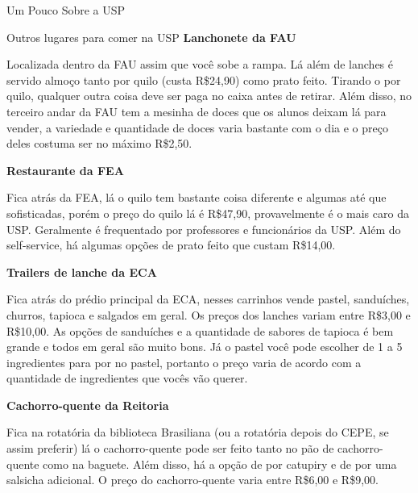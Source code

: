 \begin{secao}{Um Pouco Sobre a USP}
\begin{subsecao}{Outros lugares para comer na USP}
{\bf Lanchonete da FAU}

Localizada dentro da FAU assim que você sobe a rampa. Lá além de lanches é servido almoço
tanto por quilo (custa R\$24,90) como prato feito. Tirando o por quilo, qualquer outra coisa
deve ser paga no caixa antes de retirar. Além disso, no terceiro andar da FAU tem a mesinha
de doces que os alunos deixam lá para vender, a variedade e quantidade de doces varia bastante
com o dia e o preço deles costuma ser no máximo R\$2,50.

{\bf Restaurante da FEA}

Fica atrás da FEA, lá o quilo tem bastante coisa diferente e algumas até que sofisticadas,
porém o preço do quilo lá é R\$47,90, provavelmente é o mais caro da USP. Geralmente
é frequentado por professores e funcionários da USP. Além do self-service, há algumas opções
de prato feito que custam R\$14,00.

{\bf Trailers de lanche da ECA}

Fica atrás do prédio principal da ECA, nesses carrinhos vende pastel, sanduíches, churros,
tapioca e salgados em geral. Os preços dos lanches variam entre R\$3,00 e R\$10,00. As opções de
sanduíches e a quantidade de sabores de tapioca é bem grande e todos em geral são muito bons.
Já o pastel você pode escolher de 1 a 5 ingredientes para por no pastel, portanto o preço
varia de acordo com a quantidade de ingredientes que vocês vão querer.

{\bf Cachorro-quente da Reitoria}

Fica na rotatória da biblioteca Brasiliana (ou a rotatória depois do CEPE, se assim preferir)
lá o cachorro-quente pode ser feito tanto no pão de cachorro-quente como na baguete. Além disso,
há a opção de por catupiry e de por uma salsicha adicional. O preço do cachorro-quente varia
entre R\$6,00 e R\$9,00.

\end{subsecao}

\end{secao}
